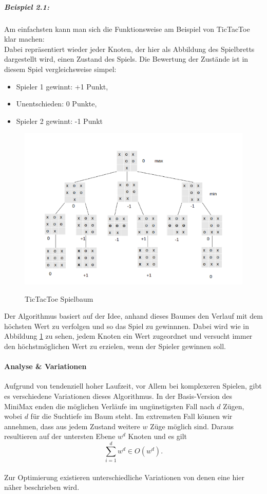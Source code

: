 \subparagraph{Beispiel 2.1:}
Am einfachsten kann man sich die Funktionsweise am Beispiel von TicTacToe klar machen:\\
Dabei repräsentiert wieder jeder Knoten, der hier als Abbildung des Spielbretts dargestellt wird, einen Zustand des Spiels. Die Bewertung der Zustände ist in diesem Spiel vergleichsweise simpel:\\
\begin{itemize}
	\item Spieler 1 gewinnt: +1 Punkt,
	\item Unentschieden: 0 Punkte,
	\item Spieler 2 gewinnt: -1 Punkt
\end{itemize}
\begin{figure}[h]
	\centering
	\includegraphics{img/Baum}
	\caption{TicTacToe Spielbaum}
	\cite{AlphaBeta}
	\label{fig:Suchbaum}
\end{figure}
Der Algorithmus basiert auf der Idee, anhand dieses Baumes den Verlauf mit dem höchsten Wert zu verfolgen und so das Spiel zu gewinnnen. Dabei wird wie in Abbildung \ref{fig:Suchbaum} zu sehen, jedem Knoten ein Wert zugeordnet und versucht immer den höchstmöglichen Wert zu erzielen, wenn der Spieler gewinnen soll.

\paragraph{Analyse \& Variationen}
Aufgrund von tendenziell hoher Laufzeit, vor Allem bei komplexeren Spielen, gibt es verschiedene Variationen dieses Algorithmus.
In der Basis-Version des MiniMax enden die möglichen Verläufe im ungünstigsten Fall nach $d$ Zügen, wobei $d$ für die Suchtiefe im Baum steht. Im extremsten Fall können wir annehmen, dass aus jedem Zustand weitere $w$ Züge möglich sind. Daraus resultieren auf der untersten Ebene $ w ^d$ Knoten und es gilt \[ \sum_{i=1}^d  w^{d}\in O(w^d).\]\\
Zur Optimierung existieren unterschiedliche Variationen von denen eine hier näher beschrieben wird.
